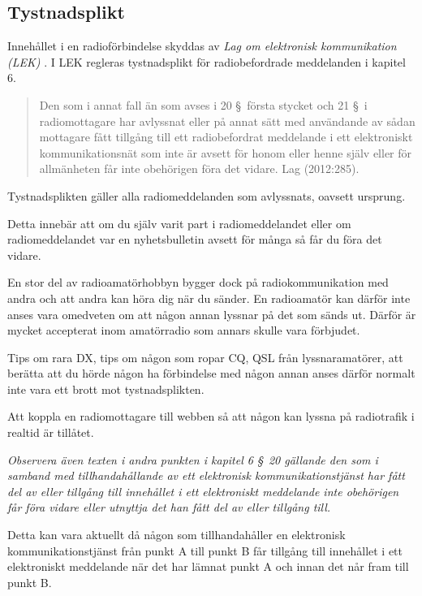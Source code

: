 \subsection{Tystnadsplikt}

Innehållet i en radioförbindelse skyddas av
\emph{Lag om elektronisk kommunikation (LEK)} \cite{SFS2003:389}.
I LEK regleras tystnadsplikt för radiobefordrade meddelanden i kapitel 6.

\begin{quote}
	Den som i annat fall än som avses i 20 \S~första stycket och 21 \S~i
	radiomottagare har avlyssnat eller på annat sätt med användande av sådan
	mottagare fått tillgång till ett radiobefordrat meddelande i ett
	elektroniskt kommunikationsnät som inte är avsett för honom eller henne
	själv eller för allmänheten får inte obehörigen föra det vidare.
	Lag (2012:285).\cite[kap 6, \S23]{SFS2003:389}
\end{quote}

Tystnadsplikten gäller alla radiomeddelanden som avlyssnats, oavsett ursprung.

Detta innebär att om du själv varit part i radiomeddelandet eller om 
radiomeddelandet var en nyhetsbulletin avsett för många så får du föra det vidare.

En stor del av radioamatörhobbyn bygger dock på radiokommunikation med andra och
att andra kan höra dig när du sänder.
En radioamatör kan därför inte anses vara omedveten om att någon annan lyssnar
på det som sänds ut.
Därför är mycket accepterat inom amatörradio som annars skulle vara förbjudet.

Tips om rara DX, tips om någon som ropar CQ, QSL från lyssnaramatörer, att
berätta att du hörde någon ha förbindelse med någon annan anses därför normalt
inte vara ett brott mot tystnadsplikten.

Att koppla en radiomottagare till webben så att någon kan lyssna på radiotrafik
i realtid är tillåtet.

\emph{Observera även texten i andra punkten i kapitel 6 \S~20 gällande den som i
	samband med tillhandahållande av ett elektronisk kommunikationstjänst har fått
	del av eller tillgång till innehållet i ett elektroniskt meddelande inte
	obehörigen får föra vidare eller utnyttja det han fått del av eller tillgång
	till.}

Detta kan vara aktuellt då någon som tillhandahåller en elektronisk
kommunikationstjänst från punkt A till punkt B får tillgång till innehållet i
ett elektroniskt meddelande när det har lämnat punkt A och innan det når fram
till punkt B.

